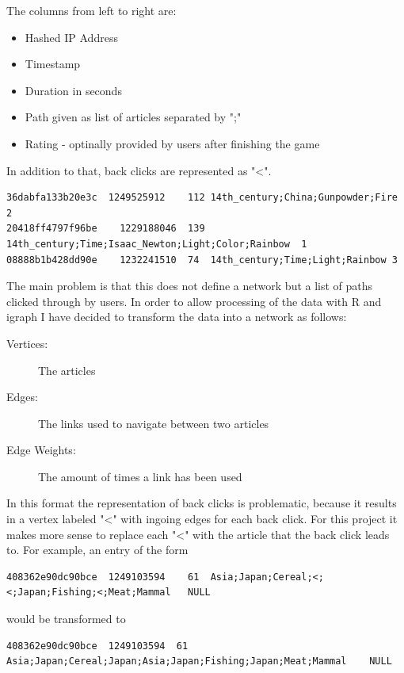\documentclass{article}\usepackage[]{graphicx}\usepackage[]{color}
\begin{document}
The columns from left to right are:
\begin{itemize}
\item Hashed IP Address
\item Timestamp
\item Duration in seconds
\item Path given as list of articles separated by ";"
\item Rating - optinally provided by users after finishing the game
\end{itemize}

In addition to that, back clicks are represented as "\textless".
\lstset{
  numbers=left,
  basicstyle=\ttfamily\scriptsize,
  frame=single,
  breaklines=true,
  tabsize=2
}
\begin{lstlisting}[title=Excerpt: Wipispeedia Dataset ]
36dabfa133b20e3c  1249525912	112	14th_century;China;Gunpowder;Fire	2
20418ff4797f96be	1229188046	139	14th_century;Time;Isaac_Newton;Light;Color;Rainbow	1
08888b1b428dd90e	1232241510	74	14th_century;Time;Light;Rainbow	3
\end{lstlisting}

The main problem is that this does not define a network but a list of paths clicked through by users. In order to allow processing of the data with R and igraph I have decided to transform the data into a network as follows:
\begin{description}
\item[Vertices:] The articles 
\item[Edges:] The links used to navigate between two articles
\item[Edge Weights:] The amount of times a link has been used
\end{description}

In this format the representation of back clicks is problematic, because it results in a vertex labeled "\textless" with ingoing edges for each back click. For this project it makes more sense to replace each "\textless" with the article that the back click leads to. For example, an entry of the form
\begin{lstlisting}
408362e90dc90bce  1249103594	61	Asia;Japan;Cereal;<;<;Japan;Fishing;<;Meat;Mammal	NULL
\end{lstlisting}
would be transformed to 
\begin{lstlisting}
408362e90dc90bce  1249103594  61	Asia;Japan;Cereal;Japan;Asia;Japan;Fishing;Japan;Meat;Mammal	NULL
\end{lstlisting}
\end{document}
